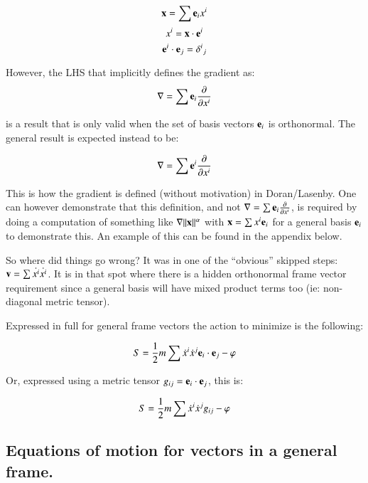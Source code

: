 \documentclass{article}
\newcommand{\grad}[0]{\nabla}
\newcommand{\PD}[2]{ \frac{\partial{#1}}{\partial {#2}} }
\begin{document}
\begin{equation*}
\mathbf{x} = \sum \mathbf{e}_i x^i
\end{equation*}
\begin{equation*}
x^i = \mathbf{x} \cdot \mathbf{e}^i
\end{equation*}
\begin{equation*}
\mathbf{e}^i \cdot \mathbf{e}_j = {\delta^i}_j
\end{equation*}

However, the LHS that implicitly defines the gradient as:
\begin{equation*}
\grad = \sum \Be_i \PD{}{x^i}
\end{equation*}

is a result that is only valid when the set of basis vectors $\mathbf{e}_i$ is orthonormal.  The general result is
expected instead to be:

\begin{equation*}
\grad = \sum \Be^i \PD{}{x^i}
\end{equation*}

This is how the gradient is defined (without motivation) in Doran/Lasenby.  One can however demonstrate that this definition, and not $\grad = \sum \Be_i \PD{}{x^i}$, is required by doing a computation of something like $\grad \norm{\Bx}^\alpha$ with $\mathbf{x} = \sum x^i \mathbf{e}_i$ for a general basis $\mathbf{e}_i$ to demonstrate this.  An example of this can be found in the appendix below.

So where did things go wrong?  It was in one of the ``obvious'' skipped steps: $\mathbf{v} = \sum \dot{x^i} \dot{x^i}$.  It is in that
spot where there is a hidden orthonormal frame vector requirement since a general basis will have mixed product terms too
(ie: non-diagonal metric tensor).

Expressed in full for general frame vectors the action to minimize is the following:

\begin{equation}
S = \frac{1}{2} m \sum \dot{x}^i \dot{x}^j \mathbf{e}_i \cdot \mathbf{e}_j -\varphi
\end{equation}

Or, expressed using a metric tensor $g_{ij} = \mathbf{e}_i \cdot \mathbf{e}_j$, this is:

\begin{equation}
S = \frac{1}{2} m \sum \dot{x}^i \dot{x}^j g_{ij} -\varphi
\end{equation}

\subsection{ Equations of motion for vectors in a general frame. }
\end{document}
